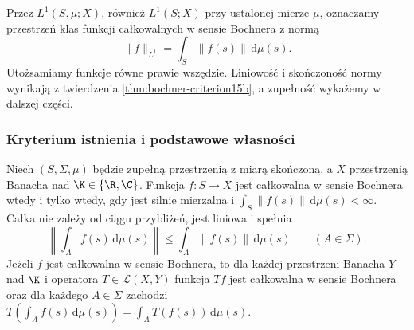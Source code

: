 \begin{definicja}[Przestrzeń $L^1(S,\mu;X)$]
\label{def:bochner-l1-space15b}
Przez $L^1(S,\mu;X)$, również $L^1(S;X)$ przy ustalonej
mierze $\mu$, oznaczamy przestrzeń klas funkcji całkowalnych
w sensie Bochnera z normą
\[
 \|f\|_{L^1}=\int_S\|f(s)\|\,\mathrm d\mu(s).
\]
Utożsamiamy funkcje równe prawie wszędzie.
Liniowość i skończoność normy wynikają z twierdzenia
\ref{thm:bochner-criterion15b}, a zupełność wykażemy
w dalszej części.
\end{definicja}

\subsubsection{Kryterium istnienia i podstawowe własności}

\begin{twierdzenie}
\label{thm:bochner-criterion15b}
Niech $(S,\Sigma,\mu)$ będzie zupełną przestrzenią z miarą
skończoną, a $X$ przestrzenią Banacha nad $\K\in\{\R,\C\}$.
Funkcja $f:S\to X$ jest całkowalna w sensie Bochnera wtedy
i tylko wtedy, gdy jest silnie mierzalna i
$\int_S\|f(s)\|\,\mathrm d\mu(s)<\infty$.
Całka nie zależy od ciągu przybliżeń, jest liniowa i spełnia
\[
 \left\|\int_A f(s)\,\mathrm d\mu(s)\right\|
 \le\int_A\|f(s)\|\,\mathrm d\mu(s)\qquad(A\in\Sigma).
\]
Jeżeli $f$ jest całkowalna w sensie Bochnera, to dla każdej
przestrzeni Banacha $Y$ nad $\K$ i operatora
$T\in\mathcal L(X,Y)$ funkcja $Tf$ jest całkowalna w sensie
Bochnera oraz dla każdego $A\in\Sigma$ zachodzi
$T(\int_A f(s)\,\mathrm d\mu(s))=\int_A T(f(s))\,\mathrm d\mu(s)$.
\end{twierdzenie}
